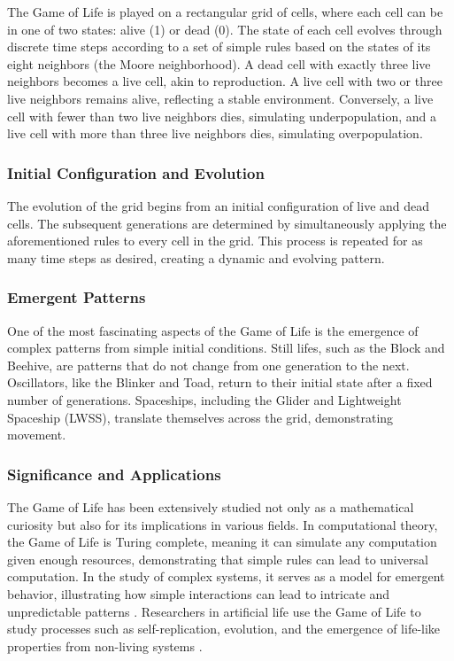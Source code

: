 \documentclass[9pt,a4paper,twoside]{tau-class/tau}
\begin{document}
    The Game of Life is played on a rectangular grid of cells, where each cell can be in one of two states: alive (1) or dead (0). The state of each cell evolves through discrete time steps according to a set of simple rules based on the states of its eight neighbors (the Moore neighborhood). A dead cell with exactly three live neighbors becomes a live cell, akin to reproduction. A live cell with two or three live neighbors remains alive, reflecting a stable environment. Conversely, a live cell with fewer than two live neighbors dies, simulating underpopulation, and a live cell with more than three live neighbors dies, simulating overpopulation.

    \subsubsection{Initial Configuration and Evolution}

    The evolution of the grid begins from an initial configuration of live and dead cells. The subsequent generations are determined by simultaneously applying the aforementioned rules to every cell in the grid. This process is repeated for as many time steps as desired, creating a dynamic and evolving pattern.

    \subsubsection{Emergent Patterns}

    One of the most fascinating aspects of the Game of Life is the emergence of complex patterns from simple initial conditions. Still lifes, such as the Block and Beehive, are patterns that do not change from one generation to the next. Oscillators, like the Blinker and Toad, return to their initial state after a fixed number of generations. Spaceships, including the Glider and Lightweight Spaceship (LWSS), translate themselves across the grid, demonstrating movement.

    \subsubsection{Significance and Applications}

    The Game of Life has been extensively studied not only as a mathematical curiosity but also for its implications in various fields. In computational theory, the Game of Life is Turing complete, meaning it can simulate any computation given enough resources, demonstrating that simple rules can lead to universal computation\cite{rendell2002turing}. In the study of complex systems, it serves as a model for emergent behavior, illustrating how simple interactions can lead to intricate and unpredictable patterns \cite{gardner1970}. Researchers in artificial life use the Game of Life to study processes such as self-replication, evolution, and the emergence of life-like properties from non-living systems \cite{langton1986}.
\end{document}
